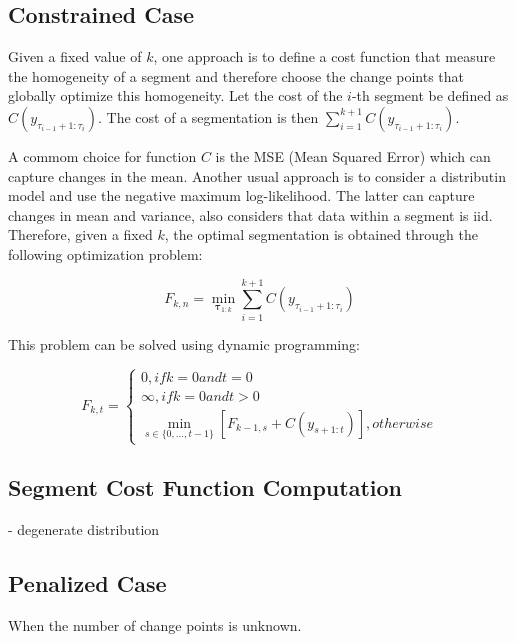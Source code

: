 \subsection{Constrained Case}

Given a fixed value of $k$, one approach is to define a cost function that measure the homogeneity of a segment and therefore choose the change points that globally optimize this homogeneity. Let the cost of the $i$-th segment be defined as $C(y_{\tau_{i - 1} + 1 : \tau_{i}})$. The cost of a segmentation is then $\sum \limits_{i = 1}^{k + 1} C(y_{\tau_{i - 1} + 1 : \tau_{i}})$.

A commom choice for function $C$ is the MSE (Mean Squared Error) which can capture changes in the mean. Another usual approach is to consider a distributin model and use the negative maximum log-likelihood. The latter can capture changes in mean and variance, also considers that data within a segment is iid. Therefore, given a fixed $k$, the optimal segmentation is obtained through the following optimization problem: 

\begin{equation}
    F_{k, n} = \min_{\boldsymbol \tau_{1 : k}} \sum \limits_{i = 1}^{k + 1} C(y_{\tau_{i - 1} + 1 : \tau_{i}})
\end{equation}

This problem can be solved using dynamic programming:

\begin{equation}
    F_{k, t} = 
    \begin{cases}
        0, if k = 0 and t = 0 \\
        \infty, if k = 0 and t > 0 \\
        \min_{s \in \{0, ..., t - 1\}} \left[ F_{k - 1, s} + C(y_{s + 1 : t}) \right], otherwise
    \end{cases}
\end{equation}

\subsection{Segment Cost Function Computation}

- degenerate distribution

\subsection{Penalized Case}

When the number of change points is unknown.


